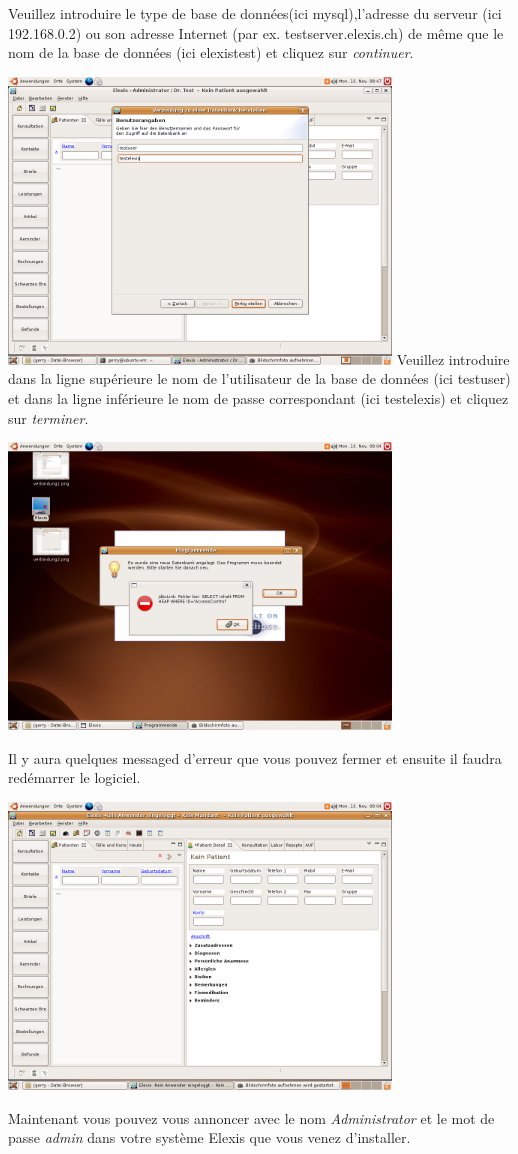 Veuillez introduire le type de base de données(ici mysql),l'adresse du serveur (ici 192.168.0.2) ou son adresse Internet (par ex.  testserver.elexis.ch) de même que le nom de la base de données (ici  elexistest) et cliquez sur \textit{continuer}.

\includegraphics[width=4in]{images/verbindung12.png}
Veuillez introduire dans la ligne supérieure le nom de l'utilisateur de la base de données (ici testuser) et dans la ligne inférieure le nom de passe correspondant (ici testelexis) et cliquez sur \textit{terminer}.

\includegraphics[width=4in]{images/verbindung13.png}

 Il y aura quelques messaged d'erreur que vous pouvez fermer et ensuite il faudra redémarrer le logiciel.

\includegraphics[width=4in]{images/verbindung14.png}

Maintenant vous pouvez vous annoncer avec le nom \textit{Administrator} et le mot de passe \textit{admin} dans votre système Elexis que vous venez d'installer.

